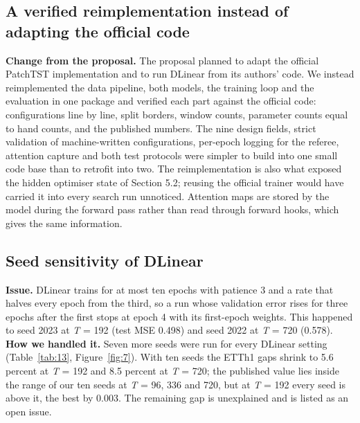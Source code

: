 \documentclass[11pt,letterpaper]{article}
\begin{document}
\subsection{A verified reimplementation instead of adapting the official code}
\textbf{Change from the proposal.} The proposal planned to adapt the official PatchTST implementation and to run DLinear from its authors' code. We instead reimplemented the data pipeline, both models, the training loop and the evaluation in one package and verified each part against the official code: configurations line by line, split borders, window counts, parameter counts equal to hand counts, and the published numbers. The nine design fields, strict validation of machine-written configurations, per-epoch logging for the referee, attention capture and both test protocols were simpler to build into one small code base than to retrofit into two. The reimplementation is also what exposed the hidden optimiser state of Section 5.2; reusing the official trainer would have carried it into every search run unnoticed. Attention maps are stored by the model during the forward pass rather than read through forward hooks, which gives the same information.

\subsection{Seed sensitivity of DLinear}
\textbf{Issue.} DLinear trains for at most ten epochs with patience 3 and a rate that halves every epoch from the third, so a run whose validation error rises for three epochs after the first stops at epoch 4 with its first-epoch weights. This happened to seed 2023 at \textit{T} = 192 (test MSE 0.498) and seed 2022 at \textit{T} = 720 (0.578). \textbf{How we handled it.} Seven more seeds were run for every DLinear setting (Table~\ref{tab:13}, Figure~\ref{fig:7}). With ten seeds the ETTh1 gaps shrink to 5.6 percent at \textit{T} = 192 and 8.5 percent at \textit{T} = 720; the published value lies inside the range of our ten seeds at \textit{T} = 96, 336 and 720, but at \textit{T} = 192 every seed is above it, the best by 0.003. The remaining gap is unexplained and is listed as an open issue.
\end{document}
